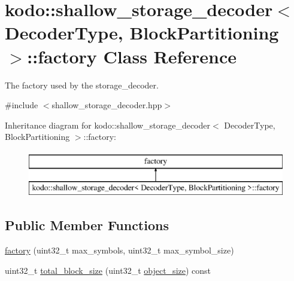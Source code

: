 \hypertarget{classkodo_1_1shallow__storage__decoder_1_1factory}{\section{kodo\-:\-:shallow\-\_\-storage\-\_\-decoder$<$ Decoder\-Type, Block\-Partitioning $>$\-:\-:factory Class Reference}
\label{classkodo_1_1shallow__storage__decoder_1_1factory}
}


The factory used by the storage\-\_\-decoder.  




{\ttfamily \#include $<$shallow\-\_\-storage\-\_\-decoder.\-hpp$>$}

Inheritance diagram for kodo\-:\-:shallow\-\_\-storage\-\_\-decoder$<$ Decoder\-Type, Block\-Partitioning $>$\-:\-:factory\-:\begin{figure}[H]
\begin{center}
\leavevmode
\includegraphics[height=2.000000cm]{classkodo_1_1shallow__storage__decoder_1_1factory}
\end{center}
\end{figure}
\subsection*{Public Member Functions}
\begin{DoxyCompactItemize}
\item 
\hyperlink{classkodo_1_1shallow__storage__decoder_1_1factory_ae47e45fee171334923c98db4771e5008}{factory} (uint32\-\_\-t max\-\_\-symbols, uint32\-\_\-t max\-\_\-symbol\-\_\-size)
\begin{DoxyCompactList}\small\item\em \end{DoxyCompactList}\item 
uint32\-\_\-t \hyperlink{classkodo_1_1shallow__storage__decoder_1_1factory_ab161d39c5415efc371d12a2f0ed60536}{total\-\_\-block\-\_\-size} (uint32\-\_\-t \hyperlink{classkodo_1_1object__decoder_ae4759b34a39ae09018af600dbc6095e7}{object\-\_\-size}) const 
\end{DoxyCompactItemize}


